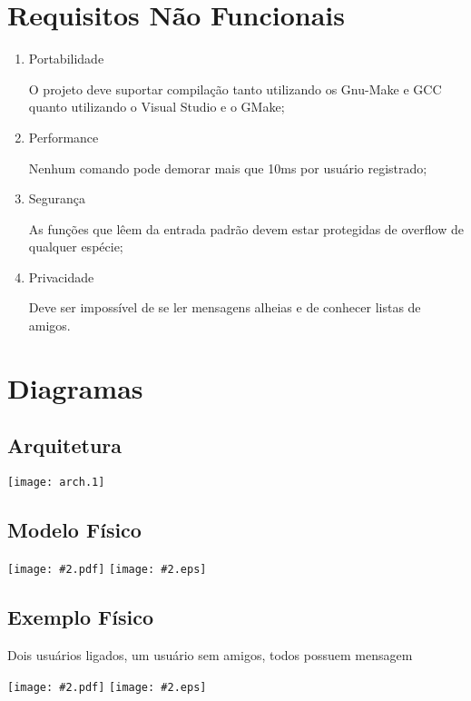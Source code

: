 \documentclass[a4paper,8pt]{article}
\newcommand{\smartmakeincludegraphics}[2][]{
\ifpdf
\texttt{[image: \#2.pdf]}
\else
\texttt{[image: \#2.eps]}
\fi
}
\begin{document}
\section{Requisitos Não Funcionais}

\begin{enumerate}

		\item Portabilidade

		O projeto deve suportar compilação tanto utilizando os Gnu-Make e GCC quanto
		utilizando o Visual Studio e o GMake;

		\item Performance

		Nenhum comando pode demorar mais que 10ms por usuário registrado;

		\item Segurança

		As funções que lêem da entrada padrão devem estar protegidas de
		overflow de qualquer espécie;

		\item Privacidade

		Deve ser impossível de se ler mensagens alheias e de conhecer listas de
		amigos.

\end{enumerate}

\section{Diagramas}
\subsection{Arquitetura}

\texttt{[image: arch.1]}
\pagebreak

\subsection{Modelo Físico}

\smartmakeincludegraphics[width=\linewidth]{modelofisico}
\pagebreak

\subsection{Exemplo Físico}

Dois usuários ligados, um usuário sem amigos, todos possuem mensagem

\smartmakeincludegraphics[width=\linewidth]{exemplofisico}
\pagebreak
\end{document}
